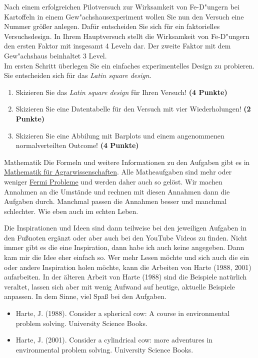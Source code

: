 \documentclass[a4paper, 9pt]{scrartcl}\usepackage[]{graphicx}\usepackage[]{xcolor}
\begin{document}
Nach einem erfolgreichen Pilotversuch zur Wirksamkeit von Fe-D{"u}ngern bei
Kartoffeln in einem Gew{"a}chshausexperiment wollen Sie nun den Versuch eine Nummer gr{\"o}{\ss}er
anlegen. Daf{\"u}r entscheiden Sie sich f{\"u}r ein faktorielles Versuchsdesign. In
Ihrem Hauptversuch stellt die Wirksamkeit von Fe-D{"u}ngern den ersten Faktor
mit insgesamt 4 Leveln dar. Der zweite Faktor mit dem Gew{"a}chshaus
beinhaltet
3 Level. \\

Im ersten Schritt {\"u}berlegen Sie ein einfaches experimentelles Design zu
probieren. Sie entscheiden sich f{\"u}r das \textit{Latin square design}.

\begin{enumerate}
  \setcounter{enumi}{0}
\item Skizieren Sie das \textit{Latin square design} f{\"u}r Ihren Versuch!
  \textbf{(4 Punkte)}
\item Skizieren Sie eine Datentabelle f{\"u}r den Versuch mit vier
  Wiederholungen! \textbf{(2 Punkte)}
\item Skizieren Sie eine Abbilung mit Barplots und einem angenommenen
  normalverteilten Outcome! \textbf{(4 Punkte)}
\end{enumerate}


 
\clearpage
\begin{graybox}{Mathematik}
Die Formeln und weitere Informationen zu den Aufgaben gibt es in \href{https://jkruppa.github.io/math/}{Mathematik für Agrarwissenschaften}. Alle Matheaufgaben sind mehr oder weniger \href{https://de.wikipedia.org/wiki/Fermi-Problem}{Fermi Probleme} und werden daher auch so gelöst. Wir machen Annahmen an die Umstände und rechnen mit diesen Annahmen dann die Aufgaben durch. Manchmal passen die Annahmen besser und manchmal schlechter. Wie eben auch im echten Leben.

Die Inspirationen und Ideen sind dann teilweise bei den jeweiligen Aufgaben in den Fußnoten ergänzt oder aber auch bei den YouTube Videos zu finden. Nicht immer gibt es die eine Inspiration, dann habe ich auch keine angegeben. Dann kam mir die Idee eher einfach so. Wer mehr Lesen möchte und sich auch die ein oder andere Inspiration holen möchte, kann die Arbeiten von Harte (1988, 2001) aufarbeiten. In der älteren Arbeit von Harte (1988) sind die Beispiele natürlich veraltet, lassen sich aber mit wenig Aufwand auf heutige, aktuelle Beispiele anpassen. In dem Sinne, viel Spaß bei den Aufgaben.

\begin{itemize}
\item Harte, J. (1988). Consider a spherical cow: A course in environmental problem solving. University Science Books.
\item Harte, J. (2001). Consider a cylindrical cow: more adventures in environmental problem solving. University Science Books.
\end{itemize}
\end{graybox}
\clearpage
\end{document}
